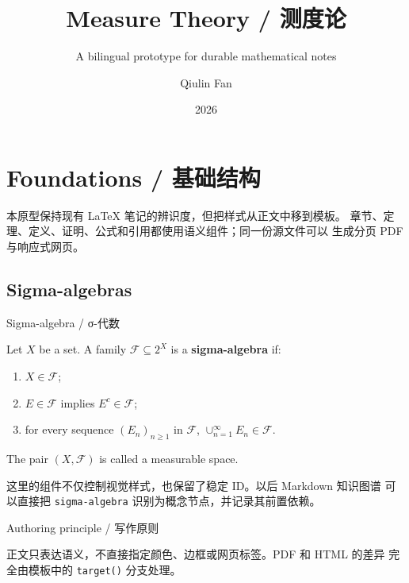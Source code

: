 \documentclass{qlnotes-export}
\title{Measure Theory / 测度论}
\subtitle{A bilingual prototype for durable mathematical notes}
\author{Qiulin Fan}
\date{2026}
\begin{document}
\frontmatter
\maketitle
\tableofcontents

\mainmatter
\chapter{Foundations / 基础结构}\label{foundations}

本原型保持现有 LaTeX 笔记的辨识度，但把样式从正文中移到模板。 章节、定理、定义、证明、公式和引用都使用语义组件；同一份源文件可以 生成分页 PDF 与响应式网页。

\section{Sigma-algebras}

\begin{definition}{Sigma-algebra / σ-代数}\label{def-sigma-algebra}

Let \(X\) be a set. A family \(\mathcal{F} \subseteq 2^{X}\) is a \textbf{sigma-algebra} if:

\begin{enumerate}
\tightlist
\item
  \(X \in \mathcal{F}\);
\item
  \(E \in \mathcal{F}\) implies \(E^{c} \in \mathcal{F}\);
\item
  for every sequence \(\left( E_{n} \right)_{n \geq 1}\) in \(\mathcal{F}\), \(\cup_{n = 1}^{\infty}E_{n} \in \mathcal{F}\).
\end{enumerate}

The pair \(\left( {X,\mathcal{F}} \right)\) is called a measurable space.

\end{definition}

这里的组件不仅控制视觉样式，也保留了稳定 ID。以后 Markdown 知识图谱 可以直接把 \texttt{sigma-algebra} 识别为概念节点，并记录其前置依赖。

\begin{qlnote}{Authoring principle / 写作原则}

正文只表达语义，不直接指定颜色、边框或网页标签。PDF 和 HTML 的差异 完全由模板中的 \texttt{target()} 分支处理。

\end{qlnote}
\end{document}
